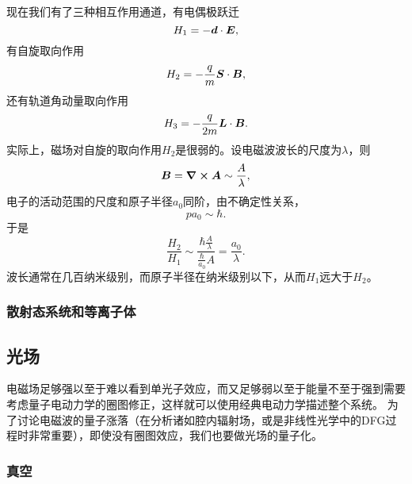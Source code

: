 \documentclass[UTF8, a4paper]{ctexart}
\begin{document}
现在我们有了三种相互作用通道，有电偶极跃迁
\begin{equation}
    H_1 = - \vb*{d} \cdot \vb*{E},
\end{equation}
有自旋取向作用
\begin{equation}
    H_2 = - \frac{q}{m} \vb*{S} \cdot \vb*{B},
\end{equation}
还有轨道角动量取向作用
\begin{equation}
    H_3 = - \frac{q}{2m} \vb*{L} \cdot \vb*{B}.
\end{equation}
实际上，磁场对自旋的取向作用${H}_2$是很弱的。设电磁波波长的尺度为$\lambda$，则
\[
    \vb*{B} = \curl{\vb*{A}} \sim \frac{A}{\lambda},
\]
电子的活动范围的尺度和原子半径$a_0$同阶，由不确定性关系，
\[
    p a_0 \sim \hbar.
\]
于是
\[
    \frac{H_2}{H_1} \sim \frac{\hbar \frac{A}{\lambda}}{\frac{\hbar}{a_0} A} = \frac{a_0}{\lambda}.
\]
波长通常在几百纳米级别，而原子半径在纳米级别以下，从而${H}_1$远大于${H}_2$。

\subsubsection{散射态系统和等离子体}

\subsection{光场}

电磁场足够强以至于难以看到单光子效应，而又足够弱以至于能量不至于强到需要考虑量子电动力学的圈图修正，这样就可以使用经典电动力学描述整个系统。
为了讨论电磁波的量子涨落（在分析诸如腔内辐射场，或是非线性光学中的DFG过程时非常重要），即使没有圈图效应，我们也要做光场的量子化。

\subsubsection{真空}
\end{document}
